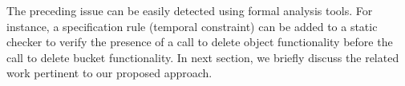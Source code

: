 The preceding issue can be easily detected using formal analysis tools.
For instance, a specification rule (temporal constraint) can be added to a static checker to verify
the presence of a call to delete object functionality before the call to delete bucket functionality.
In next section, we briefly discuss the related work pertinent to our proposed approach.


 








